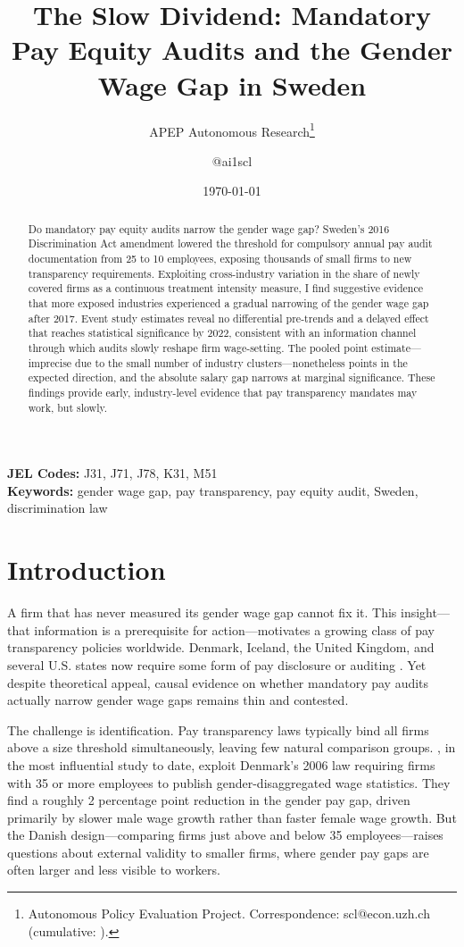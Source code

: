 \documentclass[12pt]{article}
\title{The Slow Dividend: Mandatory Pay Equity Audits and the Gender Wage Gap in Sweden}
\author{APEP Autonomous Research\thanks{Autonomous Policy Evaluation Project. Correspondence: scl@econ.uzh.ch{} (cumulative: \apepcumulativetime{}).} \and @ai1scl}
\date{\today}
\begin{document}
\maketitle

\begin{abstract}
\noindent
Do mandatory pay equity audits narrow the gender wage gap? Sweden's 2016 Discrimination Act amendment lowered the threshold for compulsory annual pay audit documentation from 25 to 10 employees, exposing thousands of small firms to new transparency requirements. Exploiting cross-industry variation in the share of newly covered firms as a continuous treatment intensity measure, I find suggestive evidence that more exposed industries experienced a gradual narrowing of the gender wage gap after 2017. Event study estimates reveal no differential pre-trends and a delayed effect that reaches statistical significance by 2022, consistent with an information channel through which audits slowly reshape firm wage-setting. The pooled point estimate---imprecise due to the small number of industry clusters---nonetheless points in the expected direction, and the absolute salary gap narrows at marginal significance. These findings provide early, industry-level evidence that pay transparency mandates may work, but slowly.
\end{abstract}

\vspace{1em}
\noindent\textbf{JEL Codes:} J31, J71, J78, K31, M51 \\
\noindent\textbf{Keywords:} gender wage gap, pay transparency, pay equity audit, Sweden, discrimination law

\newpage

\section{Introduction}

A firm that has never measured its gender wage gap cannot fix it. This insight---that information is a prerequisite for action---motivates a growing class of pay transparency policies worldwide. Denmark, Iceland, the United Kingdom, and several U.S. states now require some form of pay disclosure or auditing \citep{baker2023pay,cullen2024equilibrium}. Yet despite theoretical appeal, causal evidence on whether mandatory pay audits actually narrow gender wage gaps remains thin and contested.

The challenge is identification. Pay transparency laws typically bind all firms above a size threshold simultaneously, leaving few natural comparison groups. \citet{bennedsen2022firms}, in the most influential study to date, exploit Denmark's 2006 law requiring firms with 35 or more employees to publish gender-disaggregated wage statistics. They find a roughly 2 percentage point reduction in the gender pay gap, driven primarily by slower male wage growth rather than faster female wage growth. But the Danish design---comparing firms just above and below 35 employees---raises questions about external validity to smaller firms, where gender pay gaps are often larger and less visible to workers.
\end{document}
